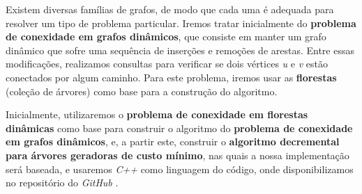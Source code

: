 Existem diversas famílias de grafos, de modo que cada uma é adequada para resolver um tipo de problema particular. Iremos tratar inicialmente do \textbf{problema de conexidade em grafos dinâmicos}, que consiste em manter um grafo dinâmico que sofre uma sequência de inserções e remoções de arestas. Entre essas modificações, realizamos consultas para verificar se dois vértices \textit{u} e \textit{v} estão conectados por algum caminho. Para este problema, iremos usar as \textbf{florestas} (coleção de árvores) como base para a construção do algoritmo.

Inicialmente, utilizaremos o \textbf{problema de conexidade em florestas dinâmicas} como base para construir o algoritmo do \textbf{problema de conexidade em grafos dinâmicos}, e, a partir este, construir o \textbf{algoritmo decremental para árvores geradoras de custo mínimo}, nas quais a nossa implementação será baseada, e usaremos \textit{C++} como linguagem do código, onde disponibilizamos no repositório do \textit{GitHub} \cite{chung2025}.